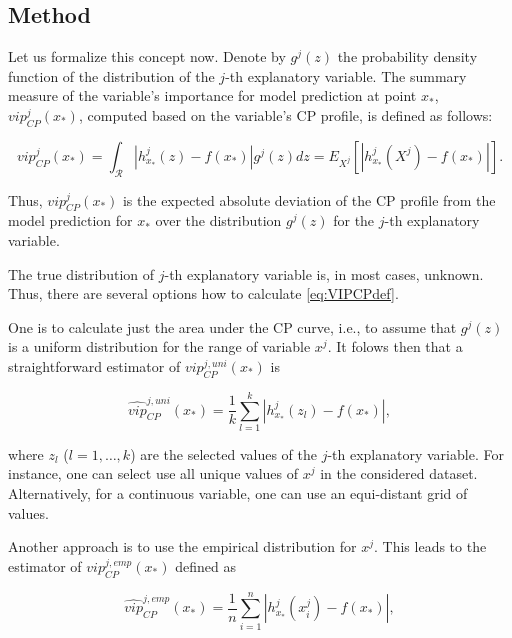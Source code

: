 \documentclass[12pt,]{krantz}
\begin{document}
\hypertarget{CPOscMethod}{%
\subsection{Method}\label{CPOscMethod}}

Let us formalize this concept now. Denote by \(g^j(z)\) the probability density function of the distribution of the \(j\)-th explanatory variable. The summary measure of the variable's importance for model prediction at point \(x_*\), \(vip_{CP}^{j}(x_*)\), computed based on the variable's CP profile, is defined as follows:

\begin{equation}
vip_{CP}^j(x_*) = \int_{\mathcal R} |h^{j}_{x_*}(z) - f(x_*)| g^j(z)dz=E_{X^j}\left[|h^{j}_{x_*}(X^j) - f(x_*)|\right].
\label{eq:VIPCPdef}
\end{equation}

Thus, \(vip_{CP}^j(x_*)\) is the expected absolute deviation of the CP profile from the model prediction for \(x_*\) over the distribution \(g^j(z)\) for the \(j\)-th explanatory variable.

The true distribution of \(j\)-th explanatory variable is, in most cases, unknown. Thus, there are several options how to calculate \eqref{eq:VIPCPdef}.

One is to calculate just the area under the CP curve, i.e., to assume that \(g^j(z)\) is a uniform distribution for the range of variable \(x^j\). It folows then that a straightforward estimator of \(vip_{CP}^{j,uni}(x_*)\) is

\begin{equation}
\widehat{vip}_{CP}^{j,uni}(x_*) = \frac 1k \sum_{l=1}^k |h^{j}_{x_*}(z_l) - f(x_*)|,
\label{eq:VIPCPuni}
\end{equation}

where \(z_l\) (\(l=1, \ldots, k\)) are the selected values of the \(j\)-th explanatory variable. For instance, one can select use all unique values of \(x^{j}\) in the considered dataset. Alternatively, for a continuous variable, one can use an equi-distant grid of values.

Another approach is to use the empirical distribution for \(x^{j}\). This leads to the estimator of \(vip_{CP}^{j,emp}(x_*)\) defined as

\begin{equation}
\widehat{vip}_{CP}^{j,emp}(x_*) = \frac 1n \sum_{i=1}^n |h^{j}_{x_*}(x^{j}_i) - f(x_*)|,
\label{eq:VIPCPemp}
\end{equation}
\end{document}
